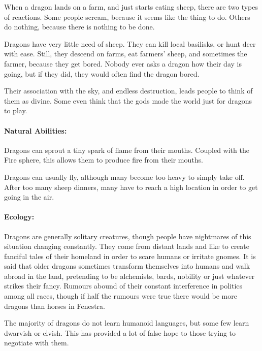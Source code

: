 \begin{multicols}{2}


\noindent
When a dragon lands on a farm, and just starts eating sheep, there are two types of reactions.
Some people scream, because it seems like the thing to do.
Others do nothing, because there is nothing to be done.

Dragons have very little need of sheep.
They can kill local basilisks, or hunt deer with ease.
Still, they descend on farms, eat farmers' sheep, and sometimes the farmer, because they get bored.
Nobody ever asks a dragon how their day is going, but if they did, they would often find the dragon bored.

Their association with the sky, and endless destruction, leads people to think of them as divine.
Some even think that the gods made the world just for dragons to play.

\paragraph{Natural Abilities:}
Dragons can sprout a tiny spark of flame from their mouths.
Coupled with the Fire sphere, this allows them to produce fire from their mouths.

Dragons can usually fly, although many become too heavy to simply take off.
After too many sheep dinners, many have to reach a high location in order to get going in the air.

\paragraph{Ecology:} Dragons are generally solitary creatures, though people have nightmares of this situation changing constantly.
They come from distant lands and like to create fanciful tales of their homeland in order to scare humans or irritate gnomes.
It is said that older dragons sometimes transform themselves into humans and walk abroad in the land, pretending to be alchemists, bards, nobility or just whatever strikes their fancy.
Rumours abound of their constant interference in politics among all races, though if half the rumours were true there would be more dragons than horses in Fenestra.

The majority of dragons do not learn humanoid languages, but some few learn dwarvish or elvish.
This has provided a lot of false hope to those trying to negotiate with them.

\dragon


\end{multicols}
